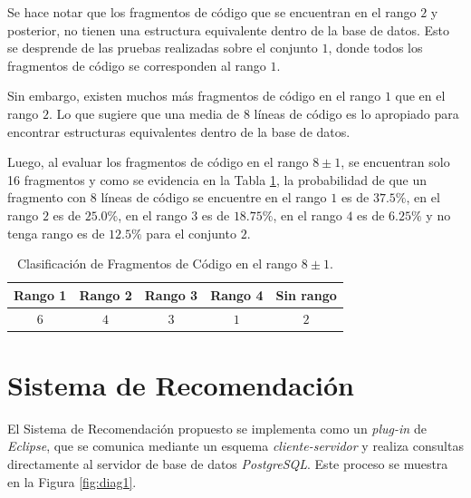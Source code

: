 Se hace notar que los fragmentos de código que se encuentran en el rango $2$ y posterior,
no tienen una estructura equivalente dentro de la base de datos.
Esto se desprende de las pruebas realizadas sobre el conjunto $1$,
donde todos los fragmentos de código se corresponden al rango $1$.

Sin embargo, existen muchos más fragmentos de código en el rango $1$ que en el rango $2$.
Lo que sugiere que una media de 8 líneas de código es lo apropiado para 
encontrar estructuras equivalentes dentro de la base de datos.

Luego, al evaluar los fragmentos de código en el rango $8\pm1$, se encuentran solo 16 fragmentos
y como se evidencia en la Tabla \ref{tab:clasificacion2}, la probabilidad de que un fragmento
con 8 líneas de código se encuentre en el rango $1$ es de $37.5\%$, en el rango $2$ es
de $25.0\%$, en el rango $3$ es de $18.75\%$, en el rango $4$ es de $6.25\%$ y no tenga rango
es de $12.5\%$ para el conjunto $2$.

\begin{table}[h]
\caption{Clasificación de Fragmentos de Código en el rango $8\pm1$.}
\label{tab:clasificacion2}
\centering
\begin{tabular}{ccccc}
\hline
{Rango 1} & {Rango 2} & {Rango 3} & {Rango 4} & {Sin rango} \\
\hline
$6$ & $4$ & $3$ & $1$ & $2$ \\
\hline
\end{tabular}
\end{table}

\section{Sistema de Recomendación}
\label{sec:DesConSisRec}

El Sistema de Recomendación propuesto se implementa como
un \textit{plug-in} de \textit{Eclipse}, que se comunica mediante
un esquema \textit{cliente-servidor} y realiza consultas directamente
al servidor de base de datos \textit{PostgreSQL}.
Este proceso se muestra en la Figura \ref{fig:diag1}.

